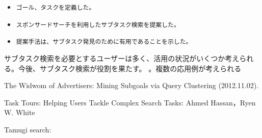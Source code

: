 \documentclass[submit,techreq]{ipsj}
\def\|{\verb|}
\begin{document}
\begin{itemize}
\item \|ゴール、タスクを定義した。|
\item \|スポンサードサーチを利用したサブタスク検索を提案した。|
\item \|提案手法は、サブタスク発見のために有用であることを示した。|
\end{itemize}

サブタスク検索を必要とするユーザーは多く、活用の状況がいくつか考えられる。今後、サブタスク検索が役割を果たす。
。複数の応用例が考えられる


\begin{thebibliography}{10}


The Widwom of Advertisers: Mining Subgoals via Query Clustering
(2012.11.02).

Task Tours: Helping Users Tackle Complex Search Tasks:
Ahmed Hassan，Ryen W. White

Tamugi search:




\end{thebibliography}



\begin{biography}
%
\end{biography}
\end{document}
